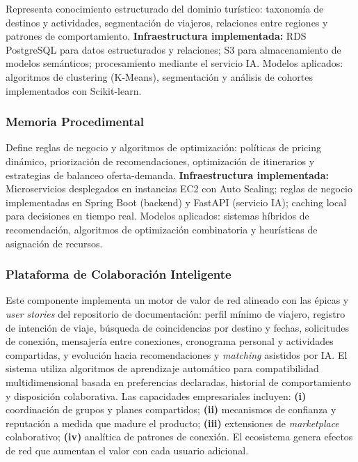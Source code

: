 \documentclass[12pt, letterpaper]{article}
\begin{document}
Representa conocimiento estructurado del dominio turístico: taxonomía de destinos y actividades, segmentación de viajeros, relaciones entre regiones y patrones de comportamiento. \textbf{Infraestructura implementada:} RDS PostgreSQL para datos estructurados y relaciones; S3 para almacenamiento de modelos semánticos; procesamiento mediante el servicio IA. Modelos aplicados: algoritmos de clustering (K-Means), segmentación y análisis de cohortes implementados con Scikit-learn.

\subsubsection{Memoria Procedimental}

Define reglas de negocio y algoritmos de optimización: políticas de pricing dinámico, priorización de recomendaciones, optimización de itinerarios y estrategias de balanceo oferta-demanda. \textbf{Infraestructura implementada:} Microservicios desplegados en instancias EC2 con Auto Scaling; reglas de negocio implementadas en Spring Boot (backend) y FastAPI (servicio IA); caching local para decisiones en tiempo real. Modelos aplicados: sistemas híbridos de recomendación, algoritmos de optimización combinatoria y heurísticas de asignación de recursos.

\subsubsection{Plataforma de Colaboración Inteligente}

Este componente implementa un motor de valor de red alineado con las épicas y \textit{user stories} del repositorio de documentación: perfil mínimo de viajero, registro de intención de viaje, búsqueda de coincidencias por destino y fechas, solicitudes de conexión, mensajería entre conexiones, cronograma personal y actividades compartidas, y evolución hacia recomendaciones y \textit{matching} asistidos por IA. El sistema utiliza algoritmos de aprendizaje automático para compatibilidad multidimensional basada en preferencias declaradas, historial de comportamiento y disposición colaborativa. Las capacidades empresariales incluyen: \textbf{(i)} coordinación de grupos y planes compartidos; \textbf{(ii)} mecanismos de confianza y reputación a medida que madure el producto; \textbf{(iii)} extensiones de \textit{marketplace} colaborativo; \textbf{(iv)} analítica de patrones de conexión. El ecosistema genera efectos de red que aumentan el valor con cada usuario adicional.
\end{document}
